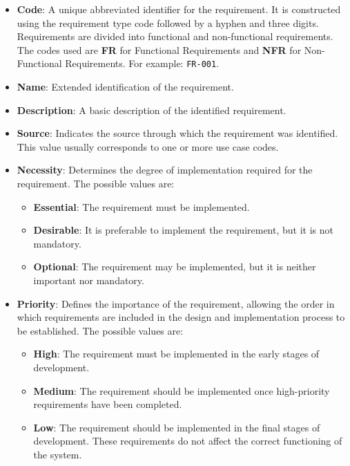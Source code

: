 \begin{itemize}
    \item \textbf{Code}: A unique abbreviated identifier for the requirement. It is constructed using the requirement type code followed by a hyphen and three digits. Requirements are divided into functional and non-functional requirements. The codes used are \textbf{FR} for Functional Requirements and \textbf{NFR} for Non-Functional Requirements. For example: \texttt{FR-001}.

    \item \textbf{Name}: Extended identification of the requirement.

    \item \textbf{Description}: A basic description of the identified requirement.

    \item \textbf{Source}: Indicates the source through which the requirement was identified. This value usually corresponds to one or more use case codes.

    \item \textbf{Necessity}: Determines the degree of implementation required for the requirement. The possible values are:
    \begin{itemize}
        \item \textbf{Essential}: The requirement must be implemented.
        \item \textbf{Desirable}: It is preferable to implement the requirement, but it is not mandatory.
        \item \textbf{Optional}: The requirement may be implemented, but it is neither important nor mandatory.
    \end{itemize}

    \item \textbf{Priority}: Defines the importance of the requirement, allowing the order in which requirements are included in the design and implementation process to be established. The possible values are:
    \begin{itemize}
        \item \textbf{High}: The requirement must be implemented in the early stages of development.
        \item \textbf{Medium}: The requirement should be implemented once high-priority requirements have been completed.
        \item \textbf{Low}: The requirement should be implemented in the final stages of development. These requirements do not affect the correct functioning of the system.
    \end{itemize}


\end{itemize}
